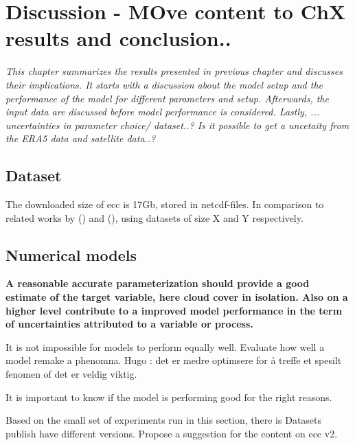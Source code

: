 \chapter{Discussion - MOve content to ChX results and conclusion..}
\textit{This chapter summarizes the results presented in previous chapter and discusses their implications. It starts with a discussion about the model setup and the performance of the model for different parameters and setup. Afterwards, the input data are discussed before model performance is considered. Lastly, ... uncertainties in parameter choice/ dataset..? Is it possible to get a uncetaity from the ERA5 data and satellite data..?} 

\section{Dataset}
The downloaded size of \acrshort{ecc} is 17Gb, stored in \acrshort{netcdf}-files. 
In comparison to related works by \citeauthor{precip_nowcasting} (\citeyear{precip_nowcasting}) and \citeauthor{SunAirLSTM} (\citeyear{SunAirLSTM}), using datasets of size X and Y respectively.


\section{Numerical models}
\textbf{A reasonable accurate parameterization should provide a good estimate of the target variable, here cloud cover in isolation. Also on a higher level contribute to a improved model performance in the term of uncertainties attributed to a variable or process.}  

It is not impossible for models to perform equally well. Evaluate how well a model remake a phenomna. Hugo : det er medre optimsere for å treffe et spesilt fenomen of det er veldig viktig. 


It is important to know if the model is performing good for the right reasons.

Based on the small set of experiments run in this section, there is 
Datasets publish have different versions. Propose a suggestion for the content on \acrshort{ecc} v2.

